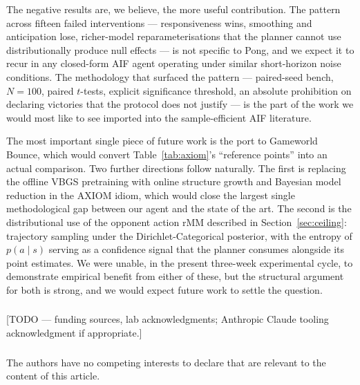 \documentclass[runningheads]{llncs}
\begin{document}
The negative results are, we believe, the more useful contribution.
The pattern across fifteen failed interventions --- responsiveness
wins, smoothing and anticipation lose, richer-model
reparameterisations that the planner cannot use distributionally
produce null effects --- is not specific to Pong, and we expect it
to recur in any closed-form AIF agent operating under similar
short-horizon noise conditions. The methodology that surfaced the
pattern --- paired-seed bench, $N=100$, paired $t$-tests, explicit
significance threshold, an absolute prohibition on declaring
victories that the protocol does not justify --- is the part of
the work we would most like to see imported into the
sample-efficient AIF literature.

The most important single piece of future work is the port to
Gameworld Bounce, which would convert
Table~\ref{tab:axiom}'s ``reference points'' into an actual
comparison. Two further directions follow naturally. The first is
replacing the offline VBGS pretraining with online structure
growth and Bayesian model reduction in the AXIOM idiom, which
would close the largest single methodological gap between our
agent and the state of the art. The second is the distributional
use of the opponent action rMM described in
Section~\ref{sec:ceiling}: trajectory sampling under the
Dirichlet-Categorical posterior, with the entropy of $p(a\mid s)$
serving as a confidence signal that the planner consumes alongside
its point estimates. We were unable, in the present three-week
experimental cycle, to demonstrate empirical benefit from either
of these, but the structural argument for both is strong, and we
would expect future work to settle the question.

\begin{credits}
\subsubsection{\ackname} [TODO --- funding sources, lab
acknowledgments; Anthropic Claude tooling acknowledgment if
appropriate.]

\subsubsection{\discintname}
The authors have no competing interests to declare that are
relevant to the content of this article.
\end{credits}
\end{document}
